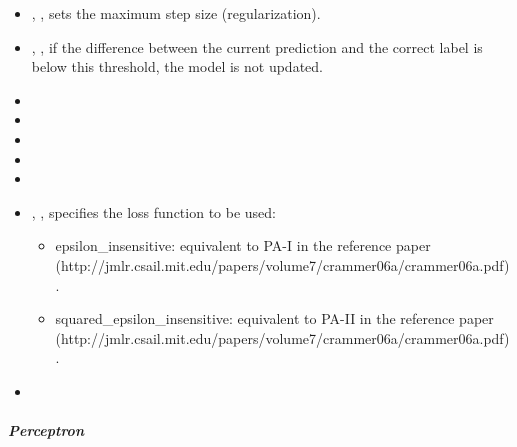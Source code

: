 \begin{itemize}
  \item {}, , sets the maximum step size
  (regularization).
  \item {}, , if the difference between the
  current prediction and the correct label is below this threshold, the model is
  not updated.
  \item {}
  \item {}
  \item {}
  \item {}
  \item \verDescriptionB{}
  \item {}, , specifies the loss
  function to be used: 
  \begin{itemize}
    \item epsilon\_insensitive: equivalent to PA-I in the reference paper (http://jmlr.csail.mit.edu/papers/volume7/crammer06a/crammer06a.pdf).
    \item squared\_epsilon\_insensitive: equivalent to PA-II in the reference paper (http://jmlr.csail.mit.edu/papers/volume7/crammer06a/crammer06a.pdf).
  \end{itemize}
  \item \warmStartDescription{}
\end{itemize}

\subparagraph{Perceptron}
\mbox{}

